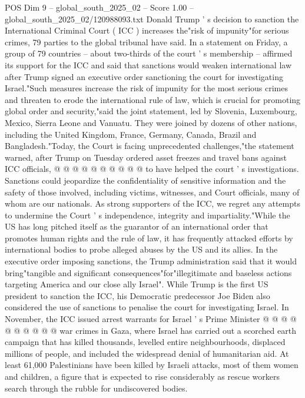 \begin{textsample}{POS Dim 9 – global\_south\_2025\_02 – Score 1.00 – global\_south\_2025\_02/120988093.txt}  \label{ex:f9_pos_397}
Donald Trump ' s decision to sanction the International Criminal Court ( ICC ) increases the"risk of impunity"for serious crimes, 79 parties to the global tribunal have said.
In a statement on Friday, a group of 79 countries -- about two-thirds of the court ' s membership -- affirmed its support for the ICC and said that sanctions would weaken international law after Trump signed an executive order sanctioning the court for investigating Israel."Such measures increase the risk of impunity for the most serious crimes and threaten to erode the international rule of law, which is crucial for promoting global order and security,"said the joint statement, led by Slovenia, Luxembourg, Mexico, Sierra Leone and Vanuatu.
They were joined by dozens of other nations, including the United Kingdom, France, Germany, Canada, Brazil and Bangladesh."Today, the Court is facing unprecedented challenges,"the statement warned, after Trump on Tuesday ordered asset freezes and travel bans against ICC officials, @ @ @ @ @ @ @ @ @ @ to have helped the court ' s investigations.
Sanctions could jeopardize the confidentiality of sensitive information and the safety of those involved, including victims, witnesses, and Court officials, many of whom are our nationals.
As strong supporters of the ICC, we regret any attempts to undermine the Court ' s independence, integrity and impartiality."While the US has long pitched itself as the guarantor of an international order that promotes human rights and the rule of law, it has frequently attacked efforts by international bodies to probe alleged abuses by the US and its allies.
In the executive order imposing sanctions, the Trump administration said that it would bring"tangible and significant consequences"for"illegitimate and baseless actions targeting America and our close ally Israel".
While Trump is the first US president to sanction the ICC, his Democratic predecessor Joe Biden also considered the use of sanctions to penalise the court for investigating Israel.
In November, the ICC issued arrest warrants for Israel ' s Prime Minister @ @ @ @ @ @ @ @ @ @ war crimes in Gaza, where Israel has carried out a scorched earth campaign that has killed thousands, levelled entire neighbourhoods, displaced millions of people, and included the widespread denial of humanitarian aid.
At least 61,000 Palestinians have been killed by Israeli attacks, most of them women and children, a figure that is expected to rise considerably as rescue workers search through the rubble for undiscovered bodies.

\end{textsample}
